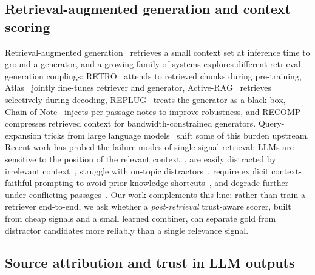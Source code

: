 \subsection{Retrieval-augmented generation and context scoring}

Retrieval-augmented generation~\cite{lewis2020rag,guu2020realm} retrieves
a small context set at inference time to ground a
generator, and a growing family of systems explores different
retrieval-generation couplings: RETRO~\cite{borgeaud2022retro} attends
to retrieved chunks during pre-training, Atlas~\cite{izacard2023atlas}
jointly fine-tunes retriever and generator, Active-RAG~\cite{jiang2023active}
retrieves selectively during decoding, REPLUG~\cite{shi2023replug}
treats the generator as a black box, Chain-of-Note~\cite{yu2023chainofnote}
injects per-passage notes to improve robustness, and
RECOMP~\cite{xu2024recomp} compresses retrieved context for
bandwidth-constrained generators. Query-expansion tricks from large
language models~\cite{ma2023queryexpansion} shift some of this burden
upstream. Recent work has probed the failure modes of single-signal
retrieval: LLMs are sensitive to the position of the relevant
context~\cite{liu2024lostinthemiddle}, are easily distracted by
irrelevant context~\cite{shi2023distracted}, struggle with on-topic
distractors~\cite{yoran2024makingrag}, require explicit
context-faithful prompting to avoid prior-knowledge
shortcuts~\cite{zhou2023context}, and degrade further under
conflicting passages~\cite{xie2024adaptive}. Our work complements this
line: rather than train a retriever end-to-end, we ask whether a
\emph{post-retrieval} trust-aware scorer, built from cheap signals and
a small learned combiner, can separate gold from distractor candidates
more reliably than a single relevance signal.

\subsection{Source attribution and trust in LLM outputs}

